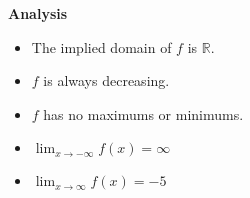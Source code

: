 \documentclass{ximera}
\begin{document}
\begin{example}
\begin{image}
\end{image}






\textbf{\textcolor{red!25!blue!75!}{Analysis}} \\

\begin{itemize}
\item The implied domain of $f$ is $\mathbb{R}$.
\item $f$ is always decreasing.
\item $f$ has no maximums or minimums.
\item $\lim_{x \to -\infty} f(x) = \infty$
\item $\lim_{x \to \infty} f(x) = -5$
\end{itemize}


\end{example}
\end{document}
